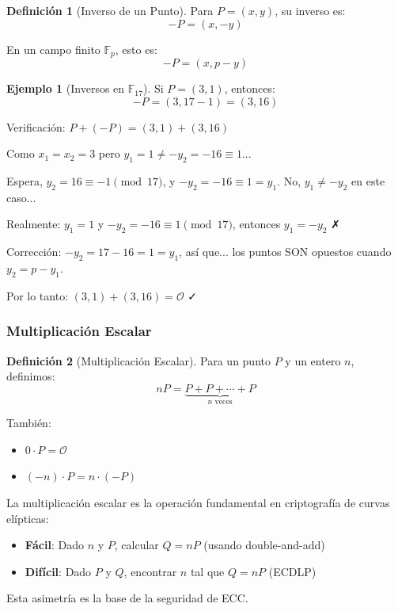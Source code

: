 \documentclass[11pt,a4paper,twoside,openright]{book}
\theoremstyle{definition}
\newtheorem{definition}{Definición}[chapter]
\newtheorem{example}{Ejemplo}[chapter]
\theoremstyle{plain}
\theoremstyle{remark}
\begin{document}
\begin{definition}[Inverso de un Punto]
Para $P = (x, y)$, su inverso es:
\[
-P = (x, -y)
\]

En un campo finito $\mathbb{F}_p$, esto es:
\[
-P = (x, p - y)
\]
\end{definition}

\begin{example}[Inversos en $\mathbb{F}_{17}$]
Si $P = (3, 1)$, entonces:
\[
-P = (3, 17 - 1) = (3, 16)
\]

Verificación: $P + (-P) = (3, 1) + (3, 16)$

Como $x_1 = x_2 = 3$ pero $y_1 = 1 \neq -y_2 = -16 \equiv 1$... 

Espera, $y_2 = 16 \equiv -1 \pmod{17}$, y $-y_2 = -16 \equiv 1 = y_1$. No, $y_1 \neq -y_2$ en este caso...

Realmente: $y_1 = 1$ y $-y_2 = -16 \equiv 1 \pmod{17}$, entonces $y_1 = -y_2$ ✗

Corrección: $-y_2 = 17 - 16 = 1 = y_1$, así que... los puntos SON opuestos cuando $y_2 = p - y_1$.

Por lo tanto: $(3, 1) + (3, 16) = \mathcal{O}$ ✓
\end{example}

\subsubsection{Multiplicación Escalar}

\begin{definition}[Multiplicación Escalar]
Para un punto $P$ y un entero $n$, definimos:
\[
nP = \underbrace{P + P + \cdots + P}_{n \text{ veces}}
\]

También:
\begin{itemize}
    \item $0 \cdot P = \mathcal{O}$
    \item $(-n) \cdot P = n \cdot (-P)$
\end{itemize}
\end{definition}

\begin{keyidea}
La multiplicación escalar es la operación fundamental en criptografía de curvas elípticas:
\begin{itemize}
    \item \textbf{Fácil}: Dado $n$ y $P$, calcular $Q = nP$ (usando double-and-add)
    \item \textbf{Difícil}: Dado $P$ y $Q$, encontrar $n$ tal que $Q = nP$ (ECDLP)
\end{itemize}

Esta asimetría es la base de la seguridad de ECC.
\end{keyidea}
\end{document}
